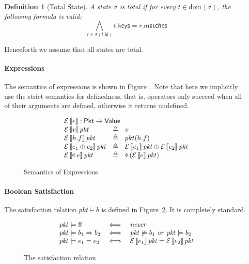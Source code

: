 \documentclass{article}
\newcommand{\pkt}{\mathit{pkt}}
\newcommand{\denote}[1]{\left\llbracket#1\right\rrbracket}
\newcommand{\edenote}[1]{\mathcal{E}\denote{#1}}
\newcommand{\FALSE}{\mathsf{ff}}
\newcommand{\binop}{\mathbin{\oplus}}
\newcommand{\unop}{\mathop{\text{\pointer}}}
\newcommand{\Value}{\mathsf{Value}}
\newcommand{\Pkt}{\mathsf{Pkt}}
\newcommand{\matches}{\mathsf{matches}}
\newcommand{\action}{\mathsf{action}}
\newcommand{\keys}{\mathsf{keys}}
\newcommand{\data}{\mathsf{data}}
\newcommand{\id}{\mathsf{id}}
\newcommand{\dom}{\textrm{dom}}
\newtheorem{definition}{Definition}
\begin{document}
\begin{definition}[Total State]
  \label{def:total-state}
  A state $\sigma$ is total if for every $t \in \dom(\sigma)$, the following
  formula is valid:
  \[\bigwedge_{r \in \sigma(t.\id)} t.\keys = r.\matches \]
\end{definition}

Henceforth we assume that all states are total.



\paragraph{Expressions}
The semantics of expressions is shown in Figure~\label{fig:sem-expr}. Note that
here we implicitly use the strict semantics for definedness, that is, operators
only succeed when all of their arguments are defined, otherwise it returns
undefined.

\begin{figure}[H]
  \[\begin{array}{l>{\triangleq}cl}
  \multicolumn{3}{l}{\edenote{e} : \Pkt \to \Value }\\
    \edenote{v}\pkt &&
    v \\
    \edenote{h.f}\pkt &&
    pkt(h.f)\\
    \edenote{e_1 \binop e_2}\pkt&&
    \edenote{e_1}\pkt \binop
    \edenote{e_2}\pkt \\
    \edenote{\unop e}\pkt &&
    \unop \left(\edenote{e}\pkt\right)
  \end{array}
  \]
  \caption{Semantics of Expressions}
  \label{fig:sem-expr}
\end{figure}

\paragraph{Boolean Satisfaction}
The satisfaction relation $\pkt \models b$ is defined in
Figure~\ref{fig:bool-satis}. It is completely standard.

\begin{figure}
  \[
  \begin{array}{l >{\iff}c l}
    \pkt \models \FALSE
    && \mathit{never}\\
    \pkt \models b_1 \Rightarrow b_2
    && \pkt \not\models b_1~\mathit{or}~\pkt \models b_2\\
    \pkt \models e_1 = e_2
    && \edenote{e_1}\pkt = \edenote{e_2}\pkt\\

  \end{array}
  \]
  \caption{The satisfaction relation}
  \label{fig:bool-satis}
\end{figure}
\end{document}
